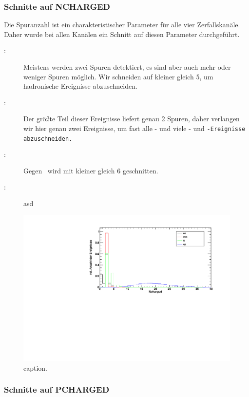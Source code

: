 \subsubsection*{Schnitte auf NCHARGED}
Die Spuranzahl ist ein charakteristischer Parameter für alle vier Zerfallskanäle.
Daher wurde bei allen Kanälen ein Schnitt auf diesen Parameter durchgeführt.
\begin{description}
\item[\Zee:] Meistens werden zwei Spuren detektiert, es sind aber auch mehr oder weniger Spuren
möglich. Wir schneiden auf kleiner gleich 5, um hadronische Ereignisse abzuschneiden.
\item[\Zmm:] Der größte Teil dieser Ereignisse liefert genau 2 Spuren,
daher verlangen wir hier genau zwei Ereignisse, um fast alle \qq- und viele \ee- und \tt-Ereignisse abzuschneiden.
\item[\Ztt:] Gegen \qq\ wird mit kleiner gleich 6 geschnitten.
\item[\Zqq:] asd
\end{description}

\begin{figure}[H]
\begin{center}
  \includegraphics[width=\textwidth]{../img/dist_Ncharged.pdf}
  \caption{caption.}
  \label{img:dist_Ncharged}
\end{center}
\end{figure} 

\subsubsection*{Schnitte auf PCHARGED}

